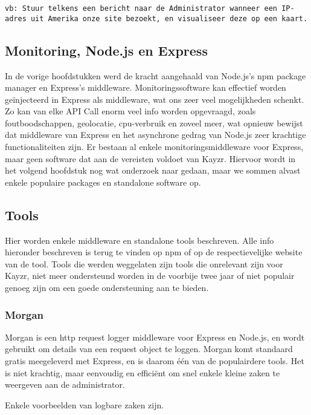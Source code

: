 \texttt{vb: Stuur telkens een bericht naar de Administrator wanneer een IP-adres uit Amerika onze site bezoekt, en visualiseer deze op een kaart.}

\subsection{Monitoring, Node.js en Express}
\label{sec:monitoringNodeExpress}

In de vorige hoofdstukken werd de kracht aangehaald van Node.js's npm package manager en Express's middleware. Monitoringssoftware kan effectief worden geïnjecteerd in Express als middleware, wat ons zeer veel mogelijkheden schenkt. Zo kan van elke API Call enorm veel info worden opgevraagd, zoals foutboodschappen, geolocatie, cpu-verbruik en zoveel meer, wat opnieuw bewijst dat middleware van Express en het asynchrone gedrag van Node.js zeer krachtige functionaliteiten zijn. Er bestaan al enkele monitoringsmiddleware voor Express, maar geen software dat aan de vereisten voldoet van Kayzr. Hiervoor wordt in het volgend hoofdstuk nog wat onderzoek naar gedaan, maar we sommen alvast enkele populaire packages en standalone software op.

\subsection{Tools}
\label{sec:tools}

Hier worden enkele middleware en standalone tools beschreven. Alle info hieronder beschreven is terug te vinden op npm of op de respectievelijke website van de tool. Tools die werden weggelaten zijn tools die onrelevant zijn voor Kayzr, niet meer ondersteund worden in de voorbije twee jaar of niet populair genoeg zijn om een goede ondersteuning aan te bieden. 

\subsubsection{Morgan}
\label{sec:morgan}

Morgan is een http request logger middleware voor Express en Node.js, en wordt gebruikt om details van een request object te loggen. Morgan komt standaard gratis meegeleverd met Express, en is daarom één van de populairdere tools. Het is niet krachtig, maar eenvoudig en efficiënt om snel enkele kleine zaken te weergeven aan de administrator.

Enkele voorbeelden van logbare zaken zijn.


